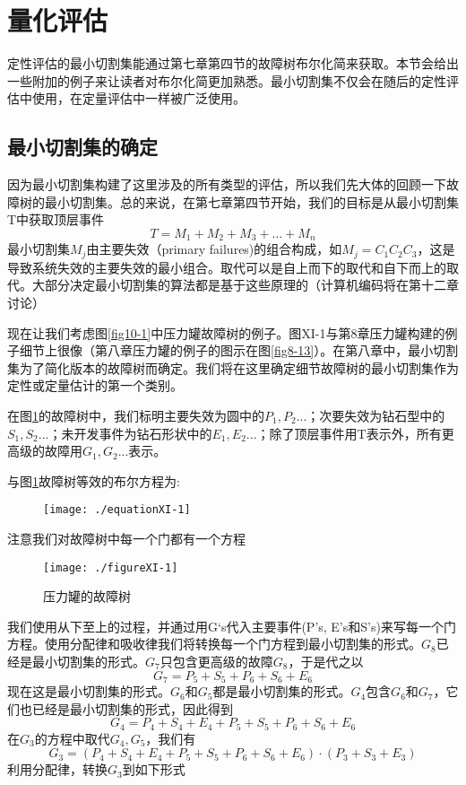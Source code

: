 \documentclass[cn,11pt,chinese]{elegantbook}
\begin{document}
{\section{量化评估}

定性评估的最小切割集能通过第七章第四节的故障树布尔化简来获取。本节会给出一些附加的例子来让读者对布尔化简更加熟悉。最小切割集不仅会在随后的定性评估中使用，在定量评估中一样被广泛使用。

\subsection{最小切割集的确定}

因为最小切割集构建了这里涉及的所有类型的评估，所以我们先大体的回顾一下故障树的最小切割集。总的来说，在第七章第四节开始，我们的目标是从最小切割集T中获取顶层事件
$$T=M_1+M_2+M_3+...+M_n$$
最小切割集$M_j$由主要失效（primary failures)的组合构成，如$M_j=C_1 C_2 C_3$，这是导致系统失效的主要失效的最小组合。取代可以是自上而下的取代和自下而上的取代。大部分决定最小切割集的算法都是基于这些原理的（计算机编码将在第十二章讨论）

现在让我们考虑图\ref{fig10-1}中压力罐故障树的例子。图XI-1与第8章压力罐构建的例子细节上很像（第八章压力罐的例子的图示在图\ref{fig8-13}）。在第八章中，最小切割集为了简化版本的故障树而确定。我们将在这里确定细节故障树的最小切割集作为定性或定量估计的第一个类别。

在图\ref{fig11-1}的故障树中，我们标明主要失效为圆中的$P_1,P_2...$；次要失效为钻石型中的$S_1,S_2...$；未开发事件为钻石形状中的$E_1,E_2...$；除了顶层事件用T表示外，所有更高级的故障用$G_1,G_2...$表示。

与图\ref{fig11-1}故障树等效的布尔方程为:

\begin{figure}[H]
	\texttt{[image: ./equationXI-1]}
\end{figure}

注意我们对故障树中每一个门都有一个方程

\begin{figure}[H]
	\texttt{[image: ./figureXI-1]}
	\caption{压力罐的故障树}
	\label{fig11-1}
\end{figure}

我们使用从下至上的过程，并通过用G‘s代入主要事件(P's, E's和S's)来写每一个门方程。使用分配律和吸收律我们将转换每一个门方程到最小切割集的形式。$G_8$已经是最小切割集的形式。$G_7$只包含更高级的故障$G_8$，于是代之以
$$G_7= P_5+S_5+P_6+S_6+E_6$$
现在这是最小切割集的形式。$G_6$和$G_5$都是最小切割集的形式。$G_4$包含$G_6$和$G_7$，它们也已经是最小切割集的形式，因此得到
$$G_4=P_4+S_4+E_4+P_5+S_5+P_6+S_6+E_6$$
在$G_3$的方程中取代$G_4,G_5$，我们有
$$G_3=(P_4+S_4+E_4+P_5+S_5+P_6+S_6+E_6)\cdot(P_3+S_3+E_3)$$
利用分配律，转换$G_3$到如下形式

}
\end{document}
